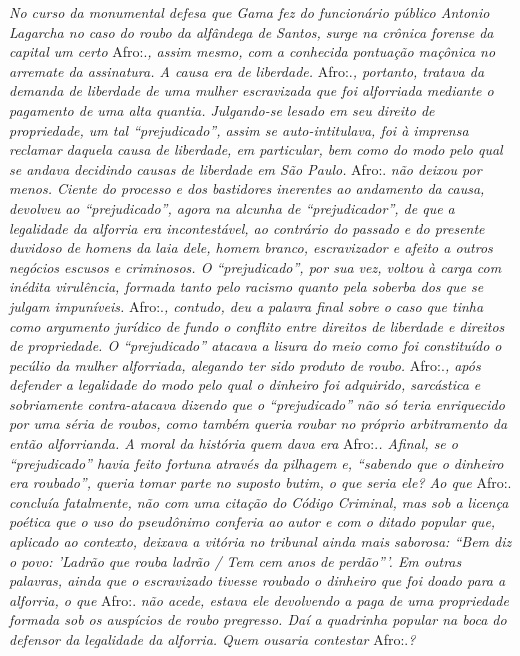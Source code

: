 \emph{No curso da monumental defesa que Gama fez do funcionário público
Antonio Lagarcha no caso do roubo da alfândega de Santos, surge na
crônica forense da capital um certo} Afro:.\emph{, assim mesmo, com a
conhecida pontuação maçônica no arremate da assinatura. A causa era de
liberdade.} Afro:.\emph{, portanto, tratava da demanda de liberdade de
uma mulher escravizada que foi alforriada mediante o pagamento de uma
alta quantia. Julgando-se lesado em seu direito de propriedade, um tal
``prejudicado'', assim se auto-intitulava, foi à imprensa reclamar
daquela causa de liberdade, em particular, bem como do modo pelo qual se
andava decidindo causas de liberdade em São Paulo.} Afro:. \emph{não
deixou por menos. Ciente do processo e dos bastidores inerentes ao
andamento da causa, devolveu ao ``prejudicado'', agora na alcunha de
``prejudicador'', de que a legalidade da alforria era incontestável, ao
contrário do passado e do presente duvidoso de homens da laia dele,
homem branco, escravizador e afeito a outros negócios escusos e
criminosos. O ``prejudicado'', por sua vez, voltou à carga com inédita
virulência, formada tanto pelo racismo quanto pela soberba dos que se
julgam impuníveis.} Afro:.\emph{, contudo, deu a palavra final sobre o
caso que tinha como argumento jurídico de fundo o conflito entre
direitos de liberdade e direitos de propriedade. O ``prejudicado''
atacava a lisura do meio como foi constituído o pecúlio da mulher
alforriada, alegando ter sido produto de roubo.} Afro:.\emph{, após
defender a legalidade do modo pelo qual o dinheiro foi adquirido,
sarcástica e sobriamente contra-atacava dizendo que o ``prejudicado''
não só teria enriquecido por uma séria de roubos, como também queria
roubar no próprio arbitramento da então alforrianda. A moral da história
quem dava era} Afro:.\emph{. Afinal, se o ``prejudicado'' havia feito
fortuna através da pilhagem e, ``sabendo que o dinheiro era roubado'',
queria tomar parte no suposto butim, o que seria ele? Ao que} Afro:.
\emph{concluía fatalmente, não com uma citação do Código Criminal, mas
sob a licença poética que o uso do pseudônimo conferia ao autor e com o
ditado popular que, aplicado ao contexto, deixava a vitória no tribunal
ainda mais saborosa: ``Bem diz o povo: 'Ladrão que rouba ladrão / Tem
cem anos de perdão'''. Em outras palavras, ainda que o escravizado
tivesse roubado o dinheiro que foi doado para a alforria, o que} Afro:.
\emph{não acede, estava ele devolvendo a paga de uma propriedade formada
sob os auspícios de roubo pregresso. Daí a quadrinha popular na boca do
defensor da legalidade da alforria. Quem ousaria contestar}
Afro:.\emph{?}

